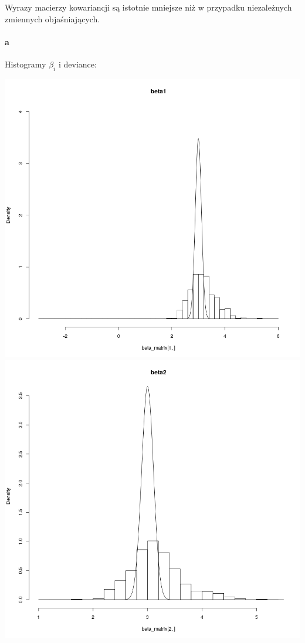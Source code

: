 \documentclass[a4paper,11pt]{article}
\begin{document}
Wyrazy macierzy kowariancji są istotnie mniejsze niż w przypadku niezależnych zmiennych objaśniających.

\paragraph{a} Histogramy $\beta_{i}$ i deviance:

\includegraphics[scale=.35]{beta42_1.png} 
\includegraphics[scale=.35]{beta42_2.png} 
\end{document}
